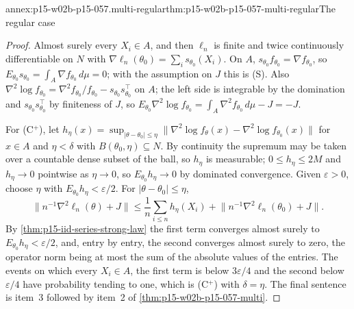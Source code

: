\begin{annexitem}{annex:p15-w02b-p15-057.multi-regular}{thm:p15-w02b-p15-057-multi-regular}{The regular case}
\begin{proof}
Almost surely every \(X_i\in A\), and then \(\ell_n\) is finite and twice
continuously differentiable on \(N\) with
\(\nabla\ell_n(\theta_0)=\sum_is_{\theta_0}(X_i)\). On \(A\),
\(s_{\theta_0}f_{\theta_0}=\nabla f_{\theta_0}\), so
\(E_{\theta_0}s_{\theta_0}=\int_A\nabla f_{\theta_0}\,d\mu=0\); with the
assumption on \(J\) this is (S). Also
\(\nabla^2\log f_{\theta_0}=\nabla^2f_{\theta_0}/f_{\theta_0}
-s_{\theta_0}s_{\theta_0}^{\top}\) on \(A\); the left side is integrable by
the domination and \(s_{\theta_0}s_{\theta_0}^{\top}\) by finiteness of
\(J\), so \(E_{\theta_0}\nabla^2\log f_{\theta_0}
=\int_A\nabla^2f_{\theta_0}\,d\mu-J=-J\).

For (C\(^{+}\)), let
\(h_\eta(x)=\sup_{|\theta-\theta_0|\leq\eta}\|\nabla^2\log f_\theta(x)
-\nabla^2\log f_{\theta_0}(x)\|\) for \(x\in A\) and \(\eta<\delta\) with
\(B(\theta_0,\eta)\subseteq N\). By continuity the supremum may be taken
over a countable dense subset of the ball, so \(h_\eta\) is measurable;
\(0\leq h_\eta\leq2M\) and \(h_\eta\to0\) pointwise as \(\eta\to0\), so
\(E_{\theta_0}h_\eta\to0\) by dominated convergence. Given
\(\varepsilon>0\), choose \(\eta\) with \(E_{\theta_0}h_\eta<\varepsilon/2\).
For \(|\theta-\theta_0|\leq\eta\),
\[
 \bigl\|n^{-1}\nabla^2\ell_n(\theta)+J\bigr\|
 \leq\frac1n\sum_{i\leq n}h_\eta(X_i)
 +\bigl\|n^{-1}\nabla^2\ell_n(\theta_0)+J\bigr\| .
\]
By \cref{thm:p15-iid-series-strong-law} the first term converges almost
surely to \(E_{\theta_0}h_\eta<\varepsilon/2\), and, entry by entry, the
second converges almost surely to zero, the operator norm being at most
the sum of the absolute values of the entries. The events on which every
\(X_i\in A\), the first term is below \(3\varepsilon/4\) and the second
below \(\varepsilon/4\) have probability tending to one, which is
(C\(^{+}\)) with \(\delta=\eta\). The final sentence is item~3 followed by
item~2 of \cref{thm:p15-w02b-p15-057-multi}.
\end{proof}
\end{annexitem}

